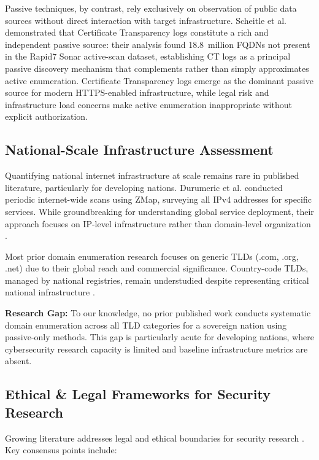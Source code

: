 \documentclass[preprint,review,12pt]{elsarticle}
\begin{document}
Passive techniques, by contrast, rely exclusively on observation of public data sources without direct interaction with target infrastructure. Scheitle et al. \cite{scheitle2018rise} demonstrated that Certificate Transparency logs constitute a rich and independent passive source: their analysis found 18.8~million FQDNs not present in the Rapid7 Sonar active-scan dataset, establishing CT logs as a principal passive discovery mechanism that complements rather than simply approximates active enumeration. Certificate Transparency logs emerge as the dominant passive source for modern HTTPS-enabled infrastructure, while legal risk and infrastructure load concerns make active enumeration inappropriate without explicit authorization.

\subsection{National-Scale Infrastructure Assessment}

Quantifying national internet infrastructure at scale remains rare in published literature, particularly for developing nations. Durumeric et al. \cite{durumeric2013search} conducted periodic internet-wide scans using ZMap, surveying all IPv4 addresses for specific services. While groundbreaking for understanding global service deployment, their approach focuses on IP-level infrastructure rather than domain-level organization \cite{bailey2010search}.

Most prior domain enumeration research focuses on generic TLDs (.com, .org, .net) due to their global reach and commercial significance. Country-code TLDs, managed by national registries, remain understudied despite representing critical national infrastructure \cite{gasser2019comparative,scheitle2018rise}.

\textbf{Research Gap:} To our knowledge, no prior published work conducts systematic domain enumeration across all TLD categories for a sovereign nation using passive-only methods. This gap is particularly acute for developing nations, where cybersecurity research capacity is limited and baseline infrastructure metrics are absent.

\subsection{Ethical \& Legal Frameworks for Security Research}

Growing literature addresses legal and ethical boundaries for security research \cite{dittrich2012community,thomson2015responsible}. Key consensus points include:
\end{document}
